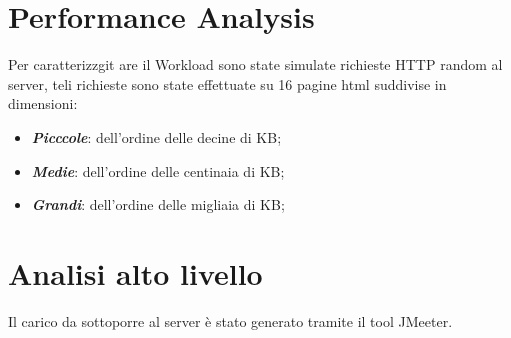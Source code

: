 \section{Performance Analysis}
Per caratterizzgit are il Workload sono state simulate richieste HTTP random al server,
teli richieste sono state effettuate su 16 pagine html suddivise in dimensioni:

\begin{itemize}
  \item \textbf{\textit{Picccole}}: dell'ordine delle decine di KB;
  \item \textbf{\textit{Medie}}: dell'ordine delle centinaia di KB;
  \item \textbf{\textit{Grandi}}: dell'ordine delle migliaia di KB;
\end{itemize}

\section{Analisi alto livello}

Il carico da sottoporre al server è stato generato tramite il tool JMeeter.\\
